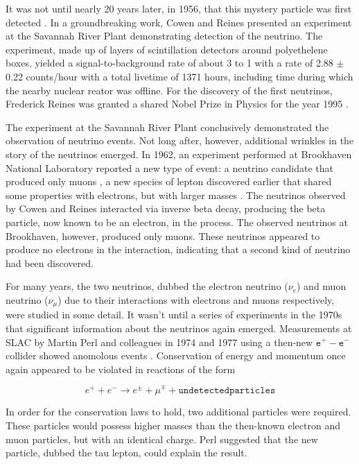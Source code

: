 It was not until nearly 20 years later, in 1956, that this mystery particle was first detected \cite{Cowan-Reines}. 
In a groundbreaking work, Cowen and Reines presented an experiment at the Savannah River Plant demonstrating detection of the neutrino.
The experiment, made up of layers of scintillation detectors around polyethelene boxes, yielded a signal-to-background rate of about 3 to 1 with a rate of 2.88 $\pm$ 0.22 counts/hour with a total livetime of 1371 hours, including time during which the nearby nuclear reator was offline.
For the discovery of the first neutrinos, Frederick Reines was granted a shared Nobel Prize in Physics for the year 1995 \cite{NobelPrize:1995-Reines}.

The experiment at the Savannah River Plant conclusively demonstrated the observation of neutrino events. 
Not long after, however, additional wrinkles in the story of the neutrinos emerged.
In 1962, an experiment performed at Brookhaven National Laboratory reported a new type of event: a neutrino candidate that produced only muons \cite{Danby-NuMu}, a new species of lepton discovered earlier that shared some properties with electrons, but with larger masses \cite{Neddermeyer-Muon}.
The neutrinos observed by Cowen and Reines interacted via inverse beta decay, producing the beta particle, now known to be an electron, in the process.
The observed neutrinos at Brookhaven, however, produced only muons.
These neutrinos appeared to produce no electrons in the interaction, indicating that a second kind of neutrino had been discovered.

For many years, the two neutrinos, dubbed the electron neutrino ($\nu_e$) and muon neutrino ($\nu_\mu$) due to their interactions with electrons and muons respectively, were studied in some detail. 
It wasn't until a series of experiments in the 1970s that significant information about the neutrinos again emerged.
Measurements at SLAC by Martin Perl and colleagues in 1974 and 1977 using a then-new $\mathtt{e^+ - e^-}$ collider showed anomolous events \cite{Perl-Tau}.
Conservation of energy and momentum once again appeared to be violated in reactions of the form 

\begin{equation}
	e^++e^- \rightarrow e^{\pm} + \mu^{\mp} + \mathtt{undetected particles}
\end{equation}

In order for the conservation laws to hold, two additional particles were required.
These particles would possess higher masses than the then-known electron and muon particles, but with an identical charge.
Perl suggested that the new particle, dubbed the tau lepton, could explain the result.

